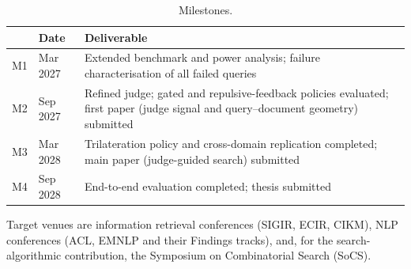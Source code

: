 \begin{table}[htbp]
\centering
\caption{Milestones.}
\label{tab:milestones}
\small
\begin{tabularx}{\textwidth}{llX}
\toprule
 & Date & Deliverable \\
\midrule
M1 & Mar 2027 & Extended benchmark and power analysis; failure characterisation of all failed queries \\
M2 & Sep 2027 & Refined judge; gated and repulsive-feedback policies evaluated; first paper (judge signal and query--document geometry) submitted \\
M3 & Mar 2028 & Trilateration policy and cross-domain replication completed; main paper (judge-guided search) submitted \\
M4 & Sep 2028 & End-to-end evaluation completed; thesis submitted \\
\bottomrule
\end{tabularx}
\end{table}

Target venues are information retrieval conferences (SIGIR, ECIR, CIKM), NLP conferences (ACL, EMNLP and their Findings tracks), and, for the search-algorithmic contribution, the Symposium on Combinatorial Search (SoCS).
